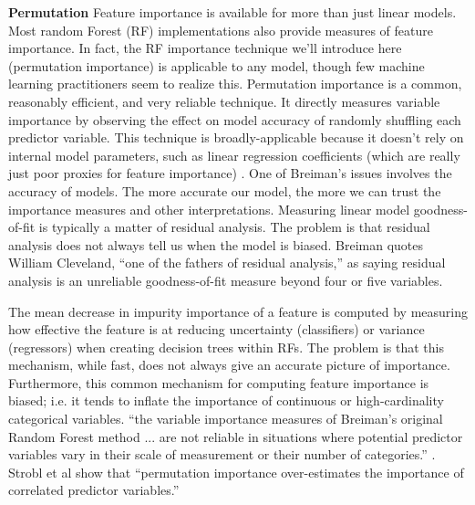 \documentclass[preprint,12pt]{elsarticle}
\begin{document}
\textbf{Permutation}
Feature importance is available for more than just linear models. Most random Forest (RF) implementations also provide measures of feature importance. In fact, the RF importance technique we'll introduce here (permutation importance) is applicable to any model, though few machine learning practitioners seem to realize this. Permutation importance is a common, reasonably efficient, and very reliable technique. It directly measures variable importance by observing the effect on model accuracy of randomly shuffling each predictor variable. This technique is broadly-applicable because it doesn't rely on internal model parameters, such as linear regression coefficients (which are really just poor proxies for feature importance) \cite{breiman2001statistical}. 
One of Breiman's issues involves the accuracy of models. The more accurate our model, the more we can trust the importance measures and other interpretations. Measuring linear model goodness-of-fit is typically a matter of residual analysis. The problem is that residual analysis does not always tell us when the model is biased. Breiman quotes William Cleveland, “one of the fathers of residual analysis,” as saying residual analysis is an unreliable goodness-of-fit measure beyond four or five variables. 


The mean decrease in impurity importance of a feature is computed by measuring how effective the feature is at reducing uncertainty (classifiers) or variance (regressors) when creating decision trees within RFs. The problem is that this mechanism, while fast, does not always give an accurate picture of importance. Furthermore, this common mechanism for computing feature importance is biased; i.e. it tends to inflate the importance of continuous or high-cardinality categorical variables. “the variable importance measures of Breiman's original Random Forest method ... are not reliable in situations where potential predictor variables vary in their scale of measurement or their number of categories.” \cite{strobl2007bias}. Strobl et al show that “permutation importance over-estimates the importance of correlated predictor variables.”
\end{document}
